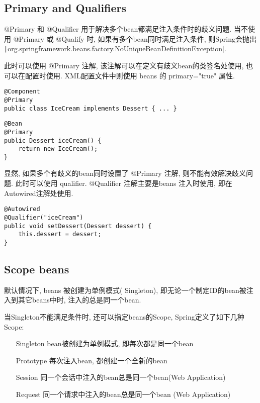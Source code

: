 \documentclass[UTF8, heading=true, scheme=chinese]{ctexart}
\begin{document}
\subsection[Primary and Qualifiers]{Primary and Qualifiers} \label{sec:qualifiers}
@Primary 和 @Qualifier 用于解决多个bean都满足注入条件时的歧义问题. 当不使用 @Primary 或 @Qualify  时,
如果有多个bean同时满足注入条件, 则Spring会抛出 \texttt|org.springframework.beans.factory.NoUniqueBeanDefinitionException|.

此时可以使用 @Primary 注解, 该注解可以在定义有歧义bean的类签名处使用, 也可以在配置时使用. XML配置文件中则使用 beans 的 primary="true" 属性.
\begin{verbatim}
@Component
@Primary
public class IceCream implements Dessert { ... }
\end{verbatim}

\begin{verbatim}
@Bean
@Primary
public Dessert iceCream() {
	return new IceCream();
}
\end{verbatim}

显然, 如果多个有歧义的bean同时设置了 @Primary 注解, 则不能有效解决歧义问题. 此时可以使用 qualifier. @Qualifier 注解主要是beans 注入时使用, 即在Autowired注解处使用.
\begin{verbatim}
@Autowired
@Qualifier("iceCream")
public void setDessert(Dessert dessert) {
	this.dessert = dessert;
}
\end{verbatim}




\subsection[Scope beans]{Scope beans} \label{sec:scope}
默认情况下, beans 被创建为单例模式( Singleton), 即无论一个制定ID的bean被注入到其它beans中时, 注入的总是同一个bean. 

当Singleton不能满足条件时, 还可以指定beans的Scope, Spring定义了如下几种Scope:
\begin{enumerate}
	\item[Singleton] bean被创建为单例模式, 即每次都是同一个bean
	\item[Prototype] 每次注入bean, 都创建一个全新的bean
	\item[Session] 同一个会话中注入的bean总是同一个bean(Web Application) 
	\item[Request] 同一个请求中注入的bean总是同一个bean (Web Application)
\end{enumerate}
\end{document}
